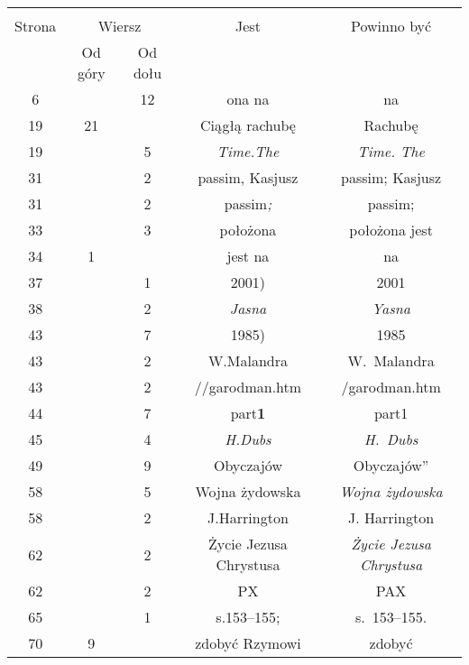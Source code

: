 \documentclass[a4paper,11pt]{article}
\begin{document}





\begin{center}

  \begin{tabular}{|c|c|c|c|c|}
    \hline
    & \multicolumn{2}{c|}{} & & \\
    Strona & \multicolumn{2}{c|}{Wiersz} & Jest
                              & Powinno być \\ \cline{2-3}
    & Od góry & Od dołu & & \\
    \hline
    6   & & 12 & ona na & na \\
    19  & 21 & & Ciągłą rachubę & Rachubę \\
    19  & &  5 & \emph{Time.The} & \emph{Time. The} \\
    31  & &  2 & passim, Kasjusz & passim; Kasjusz \\
    31  & &  2 & passim\emph{;} & passim; \\
    33  & &  3 & położona & położona jest \\
    34  &  1 & & jest na & na \\
    37  & &  1 & 2001) & 2001 \\
    38  & &  2 & \emph{Jasna} & \emph{Yasna} \\
    43  & &  7 & 1985) & 1985 \\
    43  & &  2 & W.Malandra & W.~Malandra \\
    43  & &  2 & //garodman.htm & /garodman.htm \\
    44  & &  7 & part\textbf{1} & part1 \\
    45  & &  4 & \emph{H.Dubs} & \emph{H.~Dubs} \\
    49  & &  9 & Obyczajów & Obyczajów” \\
    58  & &  5 & Wojna żydowska & \emph{Wojna żydowska} \\
    58  & &  2 & J.Harrington & J. Harrington \\
    62  & &  2 & Życie Jezusa Chrystusa & \emph{Życie Jezusa Chrystusa} \\
    62  & &  2 & PX & PAX \\
    65  & &  1 & s.153--155; & s.~153--155. \\
    70  &  9 & & zdobyć Rzymowi & zdobyć \\

\end{tabular}
\end{center}
\end{document}
